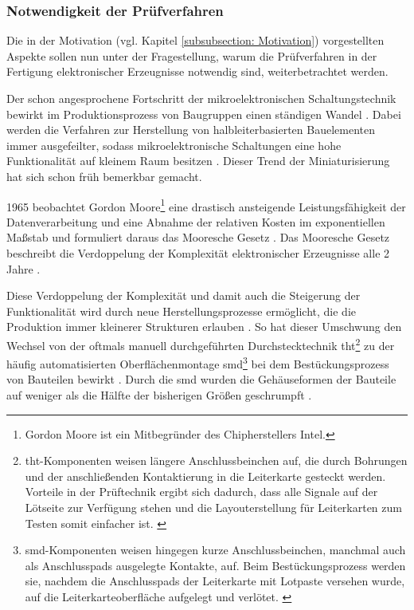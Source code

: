\subsubsection{Notwendigkeit der Prüfverfahren}
    \label{subsubsection: Notwendigkeit der Pruefverfahren}
    Die in der Motivation (vgl. Kapitel \ref{subsubsection: Motivation}) vorgestellten Aspekte sollen nun unter der Fragestellung, warum die Prüfverfahren in der Fertigung elektronischer Erzeugnisse notwendig sind, weiterbetrachtet werden.

    Der schon angesprochene Fortschritt der mikroelektronischen Schaltungstechnik bewirkt im Produktionsprozess von Baugruppen einen ständigen Wandel \cite{berger_test-_2012}.
    Dabei werden die Verfahren zur Herstellung von halbleiterbasierten Bauelementen immer ausgefeilter, sodass mikroelektronische Schaltungen eine hohe Funktionalität auf kleinem Raum besitzen \cite{berger_test-_2012} \cite{grout_integrated_2006}.
    Dieser Trend der Miniaturisierung hat sich schon früh bemerkbar gemacht.

    1965 beobachtet Gordon Moore\footnote{Gordon Moore ist ein Mitbegründer des Chipherstellers Intel.} eine drastisch ansteigende Leistungsfähigkeit der Datenverarbeitung und eine Abnahme der relativen Kosten im exponentiellen Maßstab und formuliert daraus das Mooresche Gesetz \cite{noauthor_uber_nodate}.
    Das Mooresche Gesetz beschreibt die Verdoppelung der Komplexität elektronischer Erzeugnisse alle 2 Jahre \cite{berger_test-_2012}.

    Diese Verdoppelung der Komplexität und damit auch die Steigerung der Funktionalität wird durch neue Herstellungsprozesse ermöglicht, die die Produktion immer kleinerer Strukturen erlauben \cite{grout_integrated_2006}.
    So hat dieser Umschwung den Wechsel von der oftmals manuell durchgeführten Durchstecktechnik \ac{tht}\footnote{\ac{tht}-Komponenten weisen längere Anschlussbeinchen auf, die durch Bohrungen und der anschließenden Kontaktierung in die Leiterkarte gesteckt werden. Vorteile in der Prüftechnik ergibt sich dadurch, dass alle Signale auf der Lötseite zur Verfügung stehen und die Layouterstellung für Leiterkarten zum Testen somit einfacher ist. \cite{berger_test-_2012}} zu der häufig automatisierten Oberflächenmontage \ac{smd}\footnote{\ac{smd}-Komponenten weisen hingegen kurze Anschlussbeinchen, manchmal auch als Anschlusspads ausgelegte Kontakte, auf. Beim Bestückungsprozess werden sie, nachdem die Anschlusspads der Leiterkarte mit Lotpaste versehen wurde, auf die Leiterkarteoberfläche aufgelegt und verlötet. \cite{noauthor_leiterplattenbestuckung_nodate}} bei dem Bestückungsprozess von Bauteilen bewirkt \cite{berger_test-_2012}.
    Durch die \ac{smd} wurden die Gehäuseformen der Bauteile auf weniger als die Hälfte der bisherigen Größen geschrumpft \cite{berger_test-_2012}.

